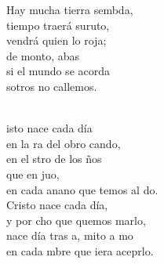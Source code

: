 \begin{cancion}
	Hay mucha tierra sembda,\\
	 tiempo traerá suruto,\\
	 vendrá quien lo roja;\\
	de monto, abas\\
	si el mundo se acorda\\
	sotros no callemos.\\\jump\\
	\begin{chorus}%
	isto nace cada día\\
	en la ra del obro cando,\\
	en el stro de los ños\\
	que en juo, \\
	en cada anano que temos al do.\\
Cristo nace cada día,\\
	y por cho que quemos marlo,\\
	nace día tras a, mito a mo  \\
	en cada mbre que iera aceprlo.\\
	\end{chorus}%
	\jump\\
\end{cancion}%
